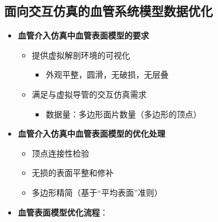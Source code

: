 \subsection[模型数据优化]{面向交互仿真的血管系统模型数据优化}

\begin{frame}
\begin{itemize}
\item \textbf{血管介入仿真中血管表面模型的要求}
\begin{itemize}
\pause \item 提供虚拟解剖环境的可视化
\begin{itemize}
\item 外观平整，圆滑，无破损，无层叠
\end{itemize}
\pause \item 满足与虚拟导管的交互仿真需求
\begin{itemize}
\item 数据量：多边形面片数量（多边形的顶点）
\end{itemize}
\end{itemize}
\pause \item \textbf{血管介入仿真中血管表面模型的优化处理}
\begin{itemize}
\pause \item 顶点连接性检验
\pause \item 无损的表面平整和修补
\pause \item 多边形精简（基于“平均表面”准则）
\end{itemize}
\end{itemize}
\end{frame}

\begin{frame}
\begin{itemize}
  \item \textbf{血管表面模型优化流程}：
\end{itemize}
\begin{figure}[t]
\centering

\end{figure}
\end{frame}

